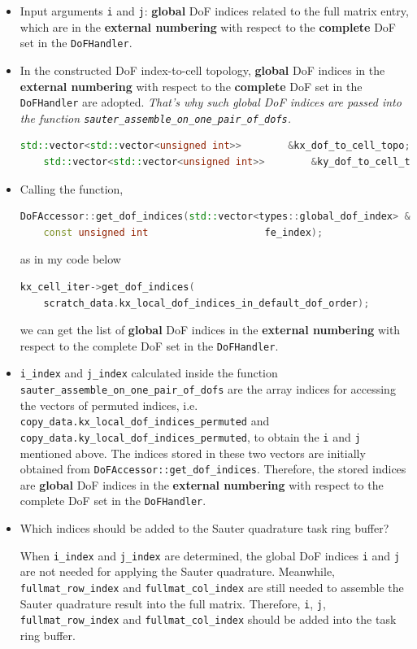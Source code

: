 \documentclass[11pt, a4paper]{book}
\begin{document}
\begin{itemize}
\item Input arguments \texttt{i} and \texttt{j}: \textbf{global} DoF indices related to
  the full matrix entry, which are in the \textbf{external numbering} with respect to the
  \textbf{complete} DoF set in the \texttt{DoFHandler}.
\item In the constructed DoF index-to-cell topology, \textbf{global} DoF indices in the
  \textbf{external numbering} with respect to the \textbf{complete} DoF set in the
  \texttt{DoFHandler} are adopted. \emph{That's why such global DoF indices are passed
    into the function \texttt{sauter\_assemble\_on\_one\_pair\_of\_dofs}.}
  \begin{lstlisting}[language=C++]
    std::vector<std::vector<unsigned int>>        &kx_dof_to_cell_topo;
    std::vector<std::vector<unsigned int>>        &ky_dof_to_cell_topo;
  \end{lstlisting}
\item Calling the function,
  \begin{lstlisting}[language=C++]
    DoFAccessor::get_dof_indices(std::vector<types::global_dof_index> &dof_indices,
    const unsigned int                    fe_index);
  \end{lstlisting}
  as in my code below
  \begin{lstlisting}[language=C++]
    kx_cell_iter->get_dof_indices(
    scratch_data.kx_local_dof_indices_in_default_dof_order);
  \end{lstlisting}
  we can get the list of \textbf{global} DoF indices in the \textbf{external numbering}
  with respect to the complete DoF set in the \texttt{DoFHandler}.
\item \texttt{i\_index} and \texttt{j\_index} calculated inside the function
  \texttt{sauter\_assemble\_on\_one\_pair\_of\_dofs} are the array indices for accessing
  the vectors of permuted indices, i.e.
  \texttt{copy\_data.kx\_local\_dof\_indices\_permuted} and
  \texttt{copy\_data.ky\_local\_dof\_indices\_permuted}, to obtain the \texttt{i} and
  \texttt{j} mentioned above. The indices stored in these two vectors are initially
  obtained from \texttt{DoFAccessor::get\_dof\_indices}. Therefore, the stored indices are
  \textbf{global} DoF indices in the \textbf{external numbering} with respect to the
  complete DoF set in the \texttt{DoFHandler}.
\item Which indices should be added to the Sauter quadrature task ring buffer?

  When \texttt{i\_index} and \texttt{j\_index} are determined, the global DoF indices
  \texttt{i} and \texttt{j} are not needed for applying the Sauter quadrature. Meanwhile,
  \texttt{fullmat\_row\_index} and \texttt{fullmat\_col\_index} are still needed to
  assemble the Sauter quadrature result into the full matrix. Therefore, \texttt{i},
  \texttt{j}, \texttt{fullmat\_row\_index} and \texttt{fullmat\_col\_index} should be
  added into the task ring buffer.
\end{itemize}
\end{document}
